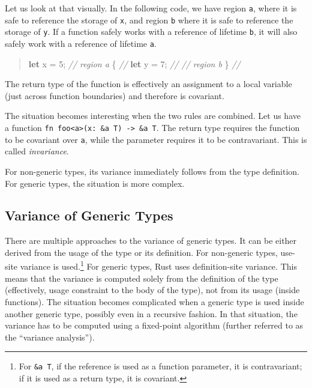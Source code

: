 \documentclass[
  11pt,
  twoside,symmetric]{report}
\newenvironment{Shaded}{}{}
\newcommand{\CommentTok}[1]{\textit{#1}}
\newcommand{\DecValTok}[1]{#1}
\newcommand{\KeywordTok}[1]{\textbf{#1}}
\newcommand{\NormalTok}[1]{#1}
\newcommand{\OperatorTok}[1]{#1}
\begin{document}
Let us look at that visually. In the following code, we have region
\texttt{\textquotesingle{}a}, where it is safe to reference the storage
of \texttt{x}, and region \texttt{\textquotesingle{}b} where it is safe
to reference the storage of \texttt{y}. If a function safely works with
a reference of lifetime \texttt{\textquotesingle{}b}, it will also
safely work with a reference of lifetime \texttt{\textquotesingle{}a}.

\begin{quote}
\begin{Shaded}
\begin{Highlighting}[]

 \KeywordTok{let}\NormalTok{ x }\OperatorTok{=} \DecValTok{5}\OperatorTok{;}        \CommentTok{// region \textquotesingle{}a}
 \OperatorTok{\{}                 \CommentTok{//}
     \KeywordTok{let}\NormalTok{ y }\OperatorTok{=} \DecValTok{7}\OperatorTok{;}    \CommentTok{//            // region \textquotesingle{}b        }
 \OperatorTok{\}}                 \CommentTok{//}
\end{Highlighting}
\end{Shaded}
\end{quote}

The return type of the function is effectively an assignment to a local
variable (just across function boundaries) and therefore is covariant.

The situation becomes interesting when the two rules are combined. Let
us have a function
\texttt{fn\ foo\textless{}\textquotesingle{}a\textgreater{}(x:\ \&\textquotesingle{}a\ T)\ -\textgreater{}\ \&\textquotesingle{}a\ T}.
The return type requires the function to be covariant over
\texttt{\textquotesingle{}a}, while the parameter requires it to be
contravariant. This is called \emph{invariance}.

For non-generic types, its variance immediately follows from the type
definition. For generic types, the situation is more complex.

\subsection{Variance of Generic Types}\label{variance-of-generic-types}

There are multiple approaches to the variance of generic types. It can
be either derived from the usage of the type or its
definition. For non-generic types,
use-site variance is used.\footnote{For
  \texttt{\&\textquotesingle{}a\ T}, if the reference is used as a
  function parameter, it is contravariant; if it is used as a return
  type, it is covariant.} For generic types, Rust uses definition-site
variance. This means that the variance is computed solely from the
definition of the type (effectively, usage constraint to the body of the
type), not from its usage (inside functions). The situation becomes
complicated when a generic type is used inside another generic type,
possibly even in a recursive fashion. In that situation, the variance
has to be computed using a fixed-point algorithm (further referred to as
the ``variance analysis'').
\end{document}
